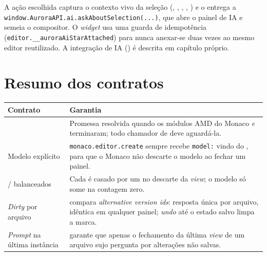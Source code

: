 \noindent
A ação escolhida captura o contexto vivo da seleção (,
, , , ) e o entrega a
\lstinline|window.AuroraAPI.ai.askAboutSelection(...)|, que abre o painel de IA e
semeia o compositor. O \emph{widget} usa uma guarda de idempotência
(\lstinline|editor.__auroraAiStarAttached|) para nunca anexar-se duas vezes ao
mesmo editor reutilizado. A integração de IA () é
descrita em capítulo próprio.

\section{Resumo dos contratos}
\label{sec:editor-contracts}

\begin{tabularx}{\linewidth}{Y Y}
\toprule
\textbf{Contrato} & \textbf{Garantia} \\
\midrule
{} & Promessa resolvida quando os módulos AMD do Monaco \emph{e}  terminaram; todo chamador de  deve aguardá-la. \\
Modelo explícito & \lstinline|monaco.editor.create| sempre recebe \lstinline|model:| vindo do , para que o Monaco não descarte o modelo ao fechar um painel. \\
/ balanceados & Cada  é casado por um  no descarte da \emph{view}; o modelo só some na contagem zero. \\
\emph{Dirty} por arquivo &  compara \emph{alternative version ids}: resposta única por arquivo, idêntica em qualquer painel; \emph{undo} até o estado salvo limpa a marca. \\
\emph{Prompt} na última instância &  garante que apenas o fechamento da última \emph{view} de um arquivo sujo pergunta por alterações não salvas. \\
\bottomrule
\end{tabularx}
